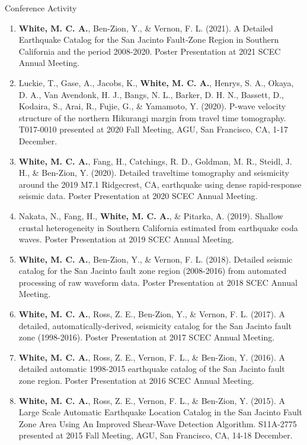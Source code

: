 \begin{rSection}{Conference Activity}
\begin{enumerate}
			\item \textbf{White, M. C. A.}, Ben-Zion, Y., \& Vernon, F. L. (2021). A Detailed Earthquake Catalog for the San Jacinto Fault‐Zone Region in Southern California and the period 2008-2020. Poster Presentation at 2021 SCEC Annual Meeting.
			
			\item Luckie, T., Gase, A., Jacobs, K., \textbf{White, M. C. A.}, Henrys, S. A., Okaya, D. A., Van Avendonk, H. J., Bangs, N. L., Barker, D. H. N., Bassett, D., Kodaira, S., Arai, R., Fujie, G., \& Yamamoto, Y. (2020). P-wave velocity structure of the northern Hikurangi margin from travel time tomography. T017-0010 presented at 2020 Fall Meeting, AGU, San Francisco, CA, 1-17 December.
			
			\item \textbf{White, M. C. A.}, Fang, H., Catchings, R. D., Goldman, M. R., Steidl, J. H., \& Ben-Zion, Y. (2020). Detailed traveltime tomography and seismicity around the 2019 M7.1 Ridgecrest, CA, earthquake using dense rapid-response seismic data. Poster Presentation at 2020 SCEC Annual Meeting.
			
			\item Nakata, N., Fang, H., \textbf{White, M. C. A.}, \& Pitarka, A. (2019). Shallow crustal heterogeneity in Southern California estimated from earthquake coda waves. Poster Presentation at 2019 SCEC Annual Meeting.
			
			\item \textbf{White, M. C. A.}, Ben-Zion, Y., \& Vernon, F. L. (2018). Detailed seismic catalog for the San Jacinto fault zone region (2008-2016) from automated processing of raw waveform data. Poster Presentation at 2018 SCEC Annual Meeting.
			
			\item \textbf{White, M. C. A.}, Ross, Z. E., Ben-Zion, Y., \& Vernon, F. L. (2017). A detailed, automatically-derived, seismicity catalog for the San Jacinto fault zone (1998-2016). Poster Presentation at 2017 SCEC Annual Meeting.
			
			\item \textbf{White, M. C. A.}, Ross, Z. E., Vernon, F. L., \& Ben-Zion, Y. (2016). A detailed automatic 1998-2015 earthquake catalog of the San Jacinto fault zone region. Poster Presentation at 2016 SCEC Annual Meeting.
			
			\item \textbf{White, M. C. A.}, Ross, Z. E., Vernon, F. L., \& Ben-Zion, Y. (2015). A Large Scale Automatic Earthquake Location Catalog in the San Jacinto Fault Zone Area Using An Improved Shear-Wave Detection Algorithm. S11A-2775 presented at 2015 Fall Meeting, AGU, San Francisco, CA, 14-18 December.
			

\end{enumerate}
\end{rSection}
